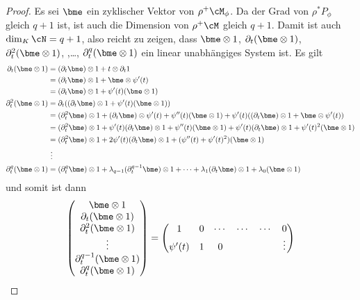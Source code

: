 \begin{proof}
Es sei $\bme$ ein zyklischer Vektor von $\rho^+\cM_{\phi}$.
Da der Grad von $\rho^*P_{\phi}$ gleich $q+1$ ist, ist auch die Dimension von
$\rho^+\cM$ gleich $q+1$. Damit ist auch $\dim_K\cN=q+1$, also reicht zu
zeigen, dass $\bme\otimes 1$, $\partial_t(\bme\otimes 1)$,
$\partial_t^2(\bme\otimes 1)$, ,\dots, $\partial_t^{q}(\bme\otimes 1)$ ein
linear unabhängiges System ist.  Es gilt
\begin{align*}
\partial_t(\bme\otimes 1) &= (\partial_t \bme)\otimes 1 + t\otimes \partial_t 1\\
  &= (\partial_t \bme)\otimes 1 + \bme\otimes \psi'(t)\\
  &= (\partial_t \bme)\otimes 1 +  \psi'(t)(\bme\otimes 1)\\
\partial_t^2(\bme\otimes 1) &= \partial_t((\partial_t \bme)\otimes 1 +
    \psi'(t)(\bme\otimes 1))\\
  &= (\partial_t^2 \bme)\otimes 1 + (\partial_t \bme)\otimes \psi'(t)
  + \psi''(t)(\bme\otimes 1)
  + \psi'(t)((\partial_t \bme)\otimes 1 + \bme\otimes \psi'(t))\\
  &= (\partial_t^2 \bme)\otimes 1
  + \psi'(t)(\partial_t \bme)\otimes 1
  + \psi''(t)(\bme\otimes 1)
  + \psi'(t)(\partial_t \bme)\otimes 1
  + \psi'(t)^2(\bme\otimes 1)\\
  &= (\partial_t^2 \bme)\otimes 1
  + 2\psi'(t)(\partial_t \bme)\otimes 1
  + (\psi''(t) + \psi'(t)^2)(\bme\otimes 1)\\
  &~\vdots\\
\partial_t^{q}(\bme\otimes 1) &= (\partial_t^q \bme)\otimes 1
  + \lambda_{q-1}(\partial_t^{q-1} \bme)\otimes 1
  +\dots
  + \lambda_{1}(\partial_t \bme)\otimes 1
  + \lambda_0(\bme\otimes 1)\\
\end{align*}
und somit ist dann
\[
\begin{pmatrix}
\bme\otimes 1\\
\partial_t(\bme\otimes 1)\\
\partial_t^2(\bme\otimes 1)\\
\vdots\\
\partial_t^{q-1}(\bme\otimes 1)\\
\partial_t^{q}(\bme\otimes 1)\\
\end{pmatrix}
=
\begin{pmatrix}
1         & 0         & \cdots & \cdots & \cdots        & 0 \\
\psi'(t)  & 1         & 0      &        &               & \vdots\\

\end{pmatrix}\]
\end{proof}

